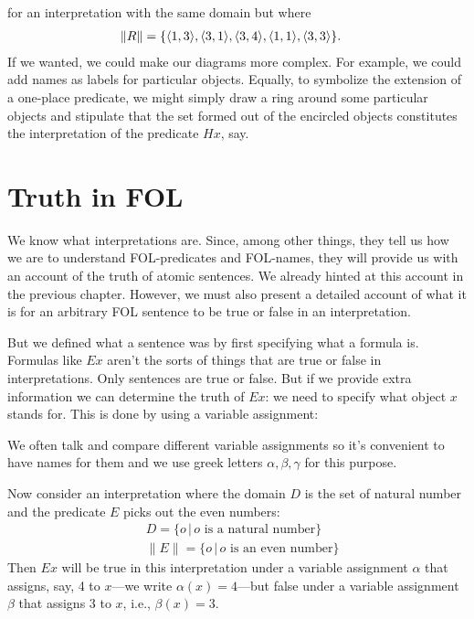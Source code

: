 \begin{center}
\end{center}
for an interpretation with the same domain but where
	\begin{align*}\|R\|&=\{
		\mathopen{\langle}1, 3\mathclose{\rangle},
		\mathopen{\langle}3, 1\mathclose{\rangle},
		\mathopen{\langle}3, 4\mathclose{\rangle},
		\mathopen{\langle}1, 1\mathclose{\rangle},
		\mathopen{\langle}3, 3\mathclose{\rangle}\}.
	\end{align*}
If we wanted, we could make our diagrams more complex. For example, we could add names as labels for particular objects. Equally, to symbolize the extension of a one-place predicate, we might simply draw a ring around some particular objects and stipulate that the set formed out of the encircled objects constitutes the interpretation of the predicate $Hx$, say.


\chapter{Truth in FOL}\label{s:TruthFOL}
We know what interpretations are. Since, among other things, they tell us how we are to understand FOL-predicates and FOL-names, they will provide us with an account of the truth of atomic sentences. We already hinted at this account in the previous chapter. However, we must also present a detailed account of what it is for an arbitrary FOL sentence to be true or false in an interpretation.

But we defined what a sentence was by first specifying what a formula is. Formulas like $Ex$ aren't the sorts of things that are true or false in interpretations. Only sentences are true or false. But if we provide extra information we can determine the truth of $Ex$: we need to specify what object $x$ stands for. This is done by using a variable assignment: 

We often talk and compare different variable assignments so it's convenient to have names for them and we use greek letters $\alpha, \beta,\gamma$ for this purpose. 

Now consider an interpretation where the domain $D$ is the set of natural number and the predicate $E$ picks out the even numbers:
\begin{align*}&D=\{o\,|\, o\text{ is a natural number}\}\\
&\|E\|=\{o\,|\,o\text{ is an even number}\}\end{align*}
Then $Ex$ will be true in this interpretation under a variable assignment $\alpha$ that assigns, say, 4 to $x$---we write $\alpha(x)=4$---but false under a variable assignment $\beta$ that assigns 3 to $x$, i.e., $\beta(x)=3$.

